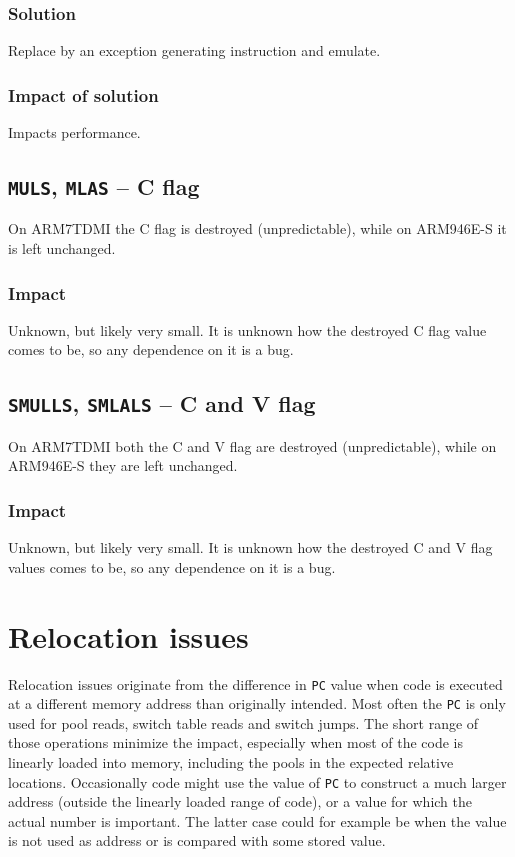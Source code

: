 \documentclass[a4paper,10pt]{report}
\begin{document}
	\subsubsection{Solution}
	Replace by an exception generating instruction and emulate.
	
	\subsubsection{Impact of solution}
	Impacts performance.
	
	\subsection{\texttt{MULS}, \texttt{MLAS} \--- C flag}
	On ARM7TDMI the C flag is destroyed (unpredictable), while on ARM946E-S it is left unchanged.
	
	\subsubsection{Impact}
	Unknown, but likely very small. It is unknown how the destroyed C flag value comes to be, so any dependence on it is a bug.
	
	\subsection{\texttt{SMULLS}, \texttt{SMLALS} \--- C and V flag}
	On ARM7TDMI both the C and V flag are destroyed (unpredictable), while on ARM946E-S they are left unchanged.
	
	\subsubsection{Impact}
	Unknown, but likely very small. It is unknown how the destroyed C and V flag values comes to be, so any dependence on it is a bug.
	
\section{Relocation issues}\label{sec:relocation}
	Relocation issues originate from the difference in \texttt{PC} value when code is executed at a different memory address than originally intended. Most often the \texttt{PC} is only used for pool reads, switch table reads and switch jumps. The short range of those operations minimize the impact, especially when most of the code is linearly loaded into memory, including the pools in the expected relative locations. Occasionally code might use the value of \texttt{PC} to construct a much larger address (outside the linearly loaded range of code), or a value for which the actual number is important. The latter case could for example be when the value is not used as address or is compared with some stored value.
	
\end{document}
